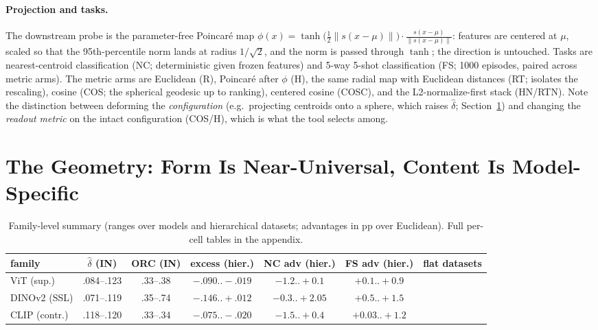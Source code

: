 \documentclass{article} %
\begin{document}
\paragraph{Projection and tasks.} The downstream probe is the parameter-free Poincar\'{e} map $\phi(x) = \tanh\!\big(\tfrac12\|s(x-\mu)\|\big)\cdot \frac{s(x-\mu)}{\|s(x-\mu)\|}$: features are centered at $\mu$, scaled so that the 95th-percentile norm lands at radius $1/\sqrt2$, and the norm is passed through $\tanh$; the direction is untouched. %
Tasks are nearest-centroid classification (NC; deterministic given frozen features) and 5-way 5-shot classification (FS; 1000 episodes, paired across metric arms). The metric arms are Euclidean (R), Poincar\'{e} after $\phi$ (H), the same radial map with Euclidean distances (RT; isolates the rescaling), cosine (COS; the spherical geodesic up to ranking), centered cosine (COSC), and the L2-normalize-first stack (HN/RTN). Note the distinction between deforming the \emph{configuration} (e.g.\ projecting centroids onto a sphere, which raises $\hat\delta$; Section~\ref{sec:geometry}) and changing the \emph{readout metric} on the intact configuration (COS/H), which is what the tool selects among.

\section{The Geometry: Form Is Near-Universal, Content Is Model-Specific}
\label{sec:geometry}

\begin{table}[t]
\centering
\small
\begin{tabular}{lcccccc}
\toprule
family & $\hat\delta$ (IN) & ORC (IN) & excess (hier.) & NC adv (hier.) & FS adv (hier.) & flat datasets \\
\midrule
ViT (sup.) & .084--.123 & .33--.38 & $-.090..-.019$ & $-1.2..+0.1$ & $+0.1..+0.9$ &  \\
DINOv2 (SSL) & .071--.119 & .35--.74 & $-.146..+.012$ & $-0.3..+2.05$ & $+0.5..+1.5$ & \\
CLIP (contr.) & .118--.120 & .33--.34 & $-.075..-.020$ & $-1.5..+0.4$ & $+0.03..+1.2$ & \\
\bottomrule
\end{tabular}
\caption{Family-level summary (ranges over models and hierarchical datasets; advantages in pp over Euclidean). Full per-cell tables in the appendix. %
}
\label{tab:summary}
\end{table}
\end{document}
